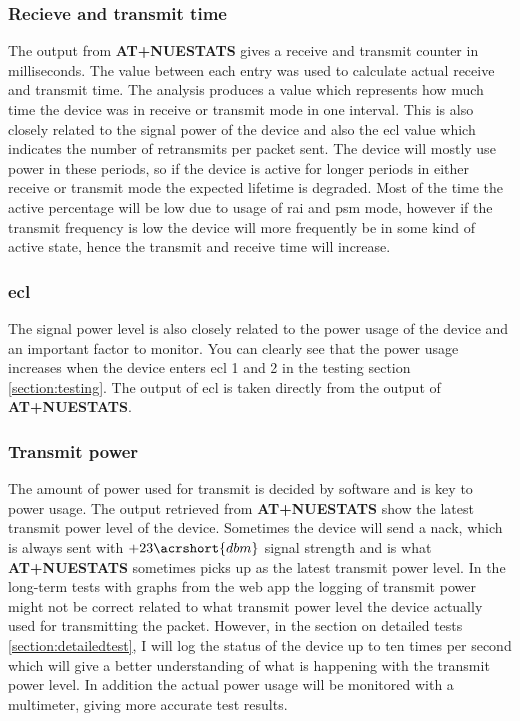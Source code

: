 \documentclass[USenglish]{ifimaster}  %
\begin{document}
\subsubsection{Recieve and transmit time}
The output from \textbf{AT+NUESTATS} gives a receive and transmit counter in milliseconds. The value between each entry was used to calculate actual receive and transmit time. The analysis produces a value which represents how much time the device was in receive or transmit mode in one interval. This is also closely related to the signal power of the device and also the \acrshort{ecl} value which indicates the number of retransmits per packet sent. The device will mostly use power in these periods, so if the device is active for longer periods in either receive or transmit mode the expected lifetime is degraded. Most of the time the active percentage will be low due to usage of \acrfull{rai} and \acrshort{psm} mode, however if the transmit frequency is low the device will more frequently be in some kind of active state, hence the transmit and receive time will increase.

\subsubsection{\acrshort{ecl}}
The signal power level is also closely related to the power usage of the device and an important factor to monitor. You can clearly see that the power usage increases when the device enters \acrshort{ecl} 1 and 2 in the testing section \vref{section:testing}. The output of \acrshort{ecl} is taken directly from the output of \textbf{AT+NUESTATS}.

\subsubsection{Transmit power} \label{paragraph:txpower}
The amount of power used for transmit is decided by software and is key to power usage. The output retrieved from \textbf{AT+NUESTATS} show the latest transmit power level of the device. Sometimes the device will send a \acrfull{nack}, which is always sent with ${+23 \acrshort{dbm}}$ signal strength and is what \textbf{AT+NUESTATS} sometimes picks up as the latest transmit power level\cite{email:nack}. In the long-term tests with graphs from the web app the logging of transmit power might not be correct related to what transmit power level the device actually used for transmitting the packet. However, in the section on detailed tests \vref{section:detailedtest}, I will log the status of the device up to ten times per second which will give a better understanding of what is happening with the transmit power level. In addition the actual power usage will be monitored with a multimeter, giving more accurate test results.
\end{document}
